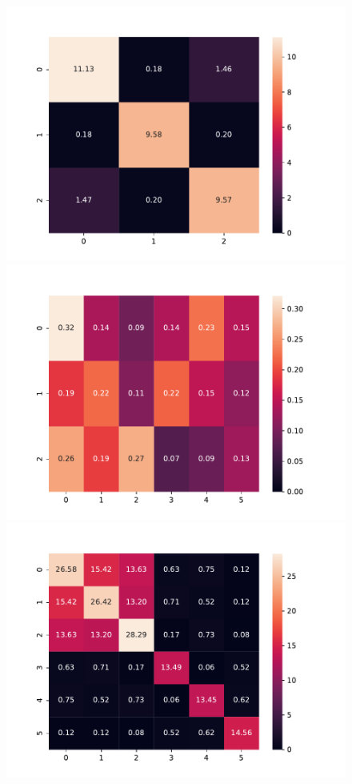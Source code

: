 \documentclass[10pt,a4paper]{article}
\begin{document}
\begin{figure}
\begin{center}
\includegraphics[scale=.3]{segnn_default_dielectric_heatmap.pdf}
\includegraphics[scale=.3]{segnn_default_piezo_heatmap.pdf}
\includegraphics[scale=.3]{segnn_default_elastic_heatmap.pdf}

\end{center}
\end{figure}
\end{document}
